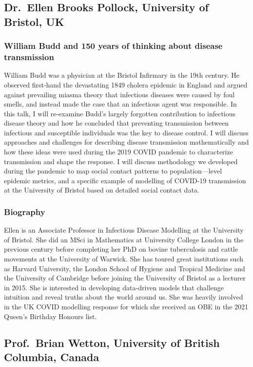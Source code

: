 \documentclass[12pt,a4paper]{article}
\begin{document}
\subsection{Dr.~Ellen Brooks Pollock, University of Bristol, UK}

\subsubsection{William Budd and 150 years of thinking about disease transmission}

William Budd was a physician at the Bristol Infirmary in the 19th century. He observed first-hand the devastating 1849 cholera epidemic in England and argued against prevailing miasma theory that infectious diseases were caused by foul smells, and instead made the case that an infectious agent was responsible. In this talk, I will re-examine Budd’s largely forgotten contribution to infectious disease theory and how he concluded that preventing transmission between infectious and susceptible individuals was the key to disease control. I will discuss approaches and challenges for describing disease transmission mathematically and how these ideas were used during the 2019 COVID pandemic to characterize transmission and shape the response. I will discuss methodology we developed during the pandemic to map social contact patterns to population—level epidemic metrics, and a specific example of modelling of COVID-19 transmission at the University of Bristol based on detailed social contact data.   
\subsubsection{Biography}

Ellen is an Associate Professor in Infectious Disease Modelling at the University of Bristol. She did an MSci in Mathematics at University College London in the previous century before completing her PhD on bovine tuberculosis and cattle movements at the University of Warwick. She has toured great institutions such as Harvard University, the London School of Hygiene and Tropical Medicine and the University of Cambridge before joining the University of Bristol as a lecturer in 2015. She is interested in developing data-driven models that challenge intuition and reveal truths about the world around us. She was heavily involved in the UK COVID modelling response for which she received an OBE in the 2021 Queen’s Birthday Honours list.  

\subsection{Prof.~Brian Wetton, University of British Columbia, Canada}
\end{document}
